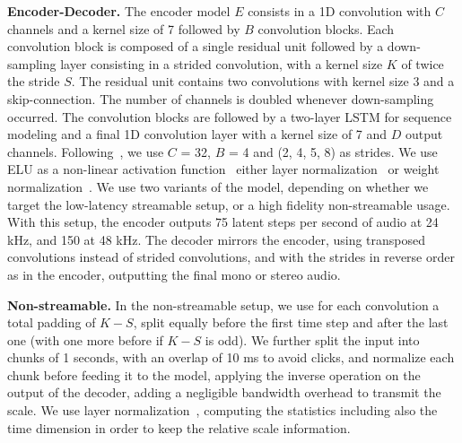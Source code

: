 {\noindent \bf Encoder-Decoder.} 
The encoder model $E$ consists in a 1D convolution with $C$ channels and a kernel size of 7 followed by $B$ convolution blocks. Each convolution block is composed of a single residual unit followed by a down-sampling layer consisting in a strided convolution, with a kernel size $K$ of twice the stride $S$. The residual unit contains two convolutions with kernel size 3 and a skip-connection. The number of channels is doubled whenever down-sampling occurred. The convolution blocks are followed by a two-layer LSTM for sequence modeling and a final 1D convolution layer with a kernel size of 7 and $D$ output channels. 
Following~\citet{zeghidour2021soundstream, li2021real}, we use $C$ = 32, $B$ = 4 and (2, 4, 5, 8) as strides. We use ELU as a non-linear activation function~\citep{clevert2015fast} either layer normalization~\citep{ba2016layer}
or weight normalization~\citep{salimans2016weight}.
We use two variants of the model, depending on whether we target the low-latency streamable setup,
or a high fidelity non-streamable usage.
With this setup, the encoder outputs 75 latent steps per second of audio at 24 kHz, and 150 at 48 kHz.
The decoder mirrors the encoder, using transposed convolutions instead of strided convolutions, and with the strides in reverse order as in the encoder, outputting the final mono or stereo audio.

{\noindent \bf Non-streamable.} 
 In the non-streamable
 setup, we use for each convolution 
a total padding of $K -S$, split equally before the first time step and after the last one (with one more before if $K - S$ is odd).
We further split the input into chunks of 1 seconds, with an overlap of 10 ms to avoid clicks, and normalize each chunk before
feeding it to the model, applying the inverse operation on the output of the decoder, adding a negligible bandwidth overhead to transmit the scale.
We use layer normalization~\citep{ba2016layer}, computing the statistics including also the time dimension in order
to keep the relative scale information.


